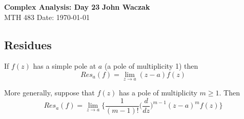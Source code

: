\documentclass[a4paper, 11pt]{article}
\begin{document}
\noindent
\large\textbf{Complex Analysis: Day 23} \hfill \textbf{John Waczak} \\
\normalsize MTH 483 \hfill  Date: \today \\


	
	
	
\subsection*{Residues} 
	If $f(z)$ has a simple pole at $a$ (a pole of multiplicity 1) then 
		\begin{equation*}
			Res_a(f) = \lim\limits_{z\to a}(z-a)f(z) 
		\end{equation*}
	
	\noindent More generally, suppose that $f(z)$ has a pole of multiplicity $m\geq 1$. Then 
		\begin{equation*}
			Res_a(f) = \lim\limits_{z\to a}\Big\{\frac{1}{(m-1)!}\Big(\frac{d}{dz}\Big)^{m-1}(z-a)^mf(z) \Big\}
		\end{equation*}
	
	
	
	
\end{document}
